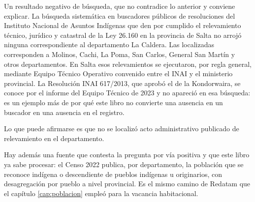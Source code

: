\begin{cautela}
Un resultado negativo de búsqueda, que no contradice lo anterior y conviene explicar. La búsqueda sistemática en buscadores públicos de resoluciones del Instituto Nacional de Asuntos Indígenas que den por cumplido el relevamiento técnico, jurídico y catastral de la Ley 26.160 en la provincia de Salta no arrojó ninguna correspondiente al departamento La Caldera. Las localizadas corresponden a Molinos, Cachi, La Poma, San Carlos, General San Martín y otros departamentos. En Salta esos relevamientos se ejecutaron, por regla general, mediante Equipo Técnico Operativo convenido entre el INAI y el ministerio provincial. La Resolución INAI 617/2013, que aprobó el de la Kondorwaira, se conoce por el informe del Equipo Técnico de 2023 y no apareció en esa búsqueda: es un ejemplo más de por qué este libro no convierte una ausencia en un buscador en una ausencia en el registro.

Lo que puede afirmarse es que no se localizó acto administrativo publicado de relevamiento en el departamento.

Hay además una fuente que contesta la pregunta por vía positiva y que este libro ya sabe procesar: el Censo 2022 publica, por departamento, la población que se reconoce indígena o descendiente de pueblos indígenas u originarios, con desagregación por pueblo a nivel provincial. Es el mismo camino de Redatam que el capítulo \ref{cap:poblacion} empleó para la vacancia habitacional.
\end{cautela}

